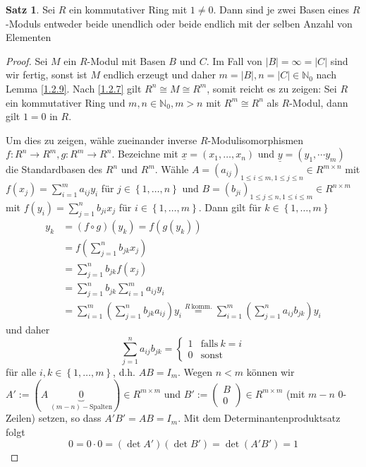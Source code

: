 \documentclass[
twoside=semi,
fontsize=12,
DIV=12, 
cleardoublepage=current,
leqno,
headings=optiontoheadandtoc, 
toc=idx
]{scrbook}
\newcommand{\N}{\mathbb{N}}
\newcommand{\brac}[1]{\left( #1 \right)}
\newcommand{\set}[1]{\left\{ #1 \right\}}
\theoremstyle{definition}
\newtheorem{satz}[definition]{Satz}
\begin{document}
	\begin{satz}\label{1.2.11}
		Sei $R$ ein kommutativer Ring mit $1 \neq 0$. Dann sind je zwei Basen eines $R$-Moduls entweder beide unendlich oder beide endlich mit der selben Anzahl von Elementen
		
		\begin{proof}
			Sei $M$ ein $R$-Modul mit Basen $B$ und $C$. Im Fall von $|B| =  \infty = |C|$ sind wir fertig, sonst ist $M$ endlich erzeugt und daher $m = |B|, n = |C| \in \N_0$ nach Lemma \ref{1.2.9}. Nach \ref{1.2.7} gilt $R^n \cong M \cong R^m$, somit reicht es zu zeigen: Sei $R$ ein kommutativer Ring und $m, n \in \N_0, m > n$ mit $R^m \cong R^n$ als $R$-Modul, dann gilt $1 = 0$ in $R$. 
			
			\noindent Um dies zu zeigen, w\"ahle zueinander inverse $R$-Modulisomorphismen $f:R^n \to R^m, g: R^m \to R^n$. Bezeichne mit $\underline{x} = (x_1, \dots, x_n)$ und $\underline{y} = (y_1, \dotsm y_m)$ die Standardbasen des $R^n$ und $R^m$. W\"ahle $A=(a_{ij})_{1\leq i \leq m, 1 \leq j \leq n}\in R^{m \times n}$ mit $f(x_j) = \sum_{i=1}^m a_{ij}y_i$ f\"ur $j \in \set{1, \dots, n}$ und $B = (b_{ji})_{1 \leq j \leq n, 1 \leq i \leq m} \in R^{n \times m}$ mit $f(y_i) = \sum_{j=1}^n b_{ji}x_j$ f\"ur $i \in \set{1, \dots, m}$. Dann gilt f\"ur $k \in \set{1, \dots, m}$
				\begin{align*}
					y_k &= (f \circ g)(y_k) = f(g(y_k))\\
					&= f\brac{\sum_{j=1}^n b_{jk}x_j}\\
					&= \sum_{j=1}^n b_{jk}f(x_j)\\
					&= \sum_{j=1}^n b_{jk}\sum_{i=1}^ma_{ij}y_i\\
					&= \sum_{i=1}^m\brac{\sum_{j=1}^n b_{jk}a_{ij} }y_i \overset{R\ \mathrm{komm.}}{=} \sum_{i=1}^m\brac{\sum_{j=1}^n a_{ij}b_{jk} }y_i
				\end{align*} 
			und daher
			\[\sum_{j=1}^n a_{ij}b_{jk} = \begin{cases}
				1 & \mathrm{falls }\ k = i\\
				0 & \mathrm{sonst}
			\end{cases}\] 
			f\"ur alle $i, k \in \set{1, \dots, m}$, d.h. $AB = I_m$.\newline
			Wegen $n < m$ k\"onnen wir $\displaystyle A' := (A\ \underbrace{0}_{(m-n)-\mathrm{Spalten}}) \in R^{m\times m}$ und $B' := \begin{pmatrix}
				B\\0
			\end{pmatrix} \in R^{m \times m}$ (mit $m-n$ $0$-Zeilen) setzen, so dass $A'B' = AB = I_m$. \newline
			Mit dem Determinantenproduktsatz folgt 
			\[0 = 0\cdot 0 = (\det A')(\det B') = \det(A'B') = 1\] 
		\end{proof}
	\end{satz}
\end{document}
